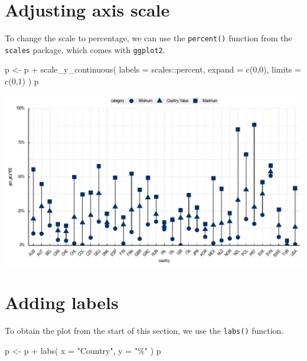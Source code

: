 \documentclass[
  11pt,
  oneside]{report}
\newenvironment{Shaded}{\begin{snugshade}}{\end{snugshade}}
\newcommand{\AttributeTok}[1]{\textcolor[rgb]{0.77,0.63,0.00}{#1}}
\newcommand{\DecValTok}[1]{\textcolor[rgb]{0.00,0.00,0.81}{#1}}
\newcommand{\FunctionTok}[1]{\textcolor[rgb]{0.00,0.00,0.00}{#1}}
\newcommand{\NormalTok}[1]{#1}
\newcommand{\OtherTok}[1]{\textcolor[rgb]{0.56,0.35,0.01}{#1}}
\newcommand{\SpecialCharTok}[1]{\textcolor[rgb]{0.00,0.00,0.00}{#1}}
\newcommand{\StringTok}[1]{\textcolor[rgb]{0.31,0.60,0.02}{#1}}
\begin{document}
\hypertarget{adjusting-axis-scale-2}{%
\section{Adjusting axis scale}\label{adjusting-axis-scale-2}}

To change the scale to percentage, we can use the \texttt{percent()}
function from the \texttt{scales} package, which comes with
\texttt{ggplot2}.

\begin{Shaded}
\begin{Highlighting}[]
\NormalTok{p }\OtherTok{\textless{}{-}}\NormalTok{ p }\SpecialCharTok{+}
  \FunctionTok{scale\_y\_continuous}\NormalTok{(}
    \AttributeTok{labels =}\NormalTok{ scales}\SpecialCharTok{::}\NormalTok{percent,}
    \AttributeTok{expand =} \FunctionTok{c}\NormalTok{(}\DecValTok{0}\NormalTok{,}\DecValTok{0}\NormalTok{),}
    \AttributeTok{limits =} \FunctionTok{c}\NormalTok{(}\DecValTok{0}\NormalTok{,}\DecValTok{1}\NormalTok{)}
\NormalTok{  )}
\NormalTok{p}
\end{Highlighting}
\end{Shaded}

\begin{center}\includegraphics{book_figures/maxmin_3-1} \end{center}

\hypertarget{adding-labels-2}{%
\section{Adding labels}\label{adding-labels-2}}

To obtain the plot from the start of this section, we use the
\texttt{labs()} function.

\begin{Shaded}
\begin{Highlighting}[]
\NormalTok{p }\OtherTok{\textless{}{-}}\NormalTok{ p }\SpecialCharTok{+}
  \FunctionTok{labs}\NormalTok{(}
    \AttributeTok{x =} \StringTok{"Country"}\NormalTok{,}
    \AttributeTok{y =} \StringTok{"\%"}
\NormalTok{  )}
\NormalTok{p}
\end{Highlighting}
\end{Shaded}
\end{document}
